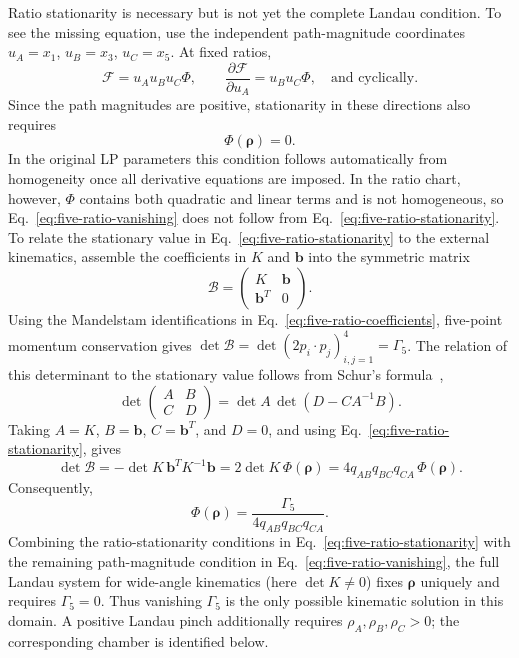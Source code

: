 \documentclass[a4paper,11pt]{article}
\begin{document}
Ratio stationarity is necessary but is not yet the complete Landau
condition.  To see the missing equation, use the independent path-magnitude
coordinates \(u_A=x_1\), \(u_B=x_3\), \(u_C=x_5\).  At fixed ratios,
\begin{equation}
 \mathcal F=u_Au_Bu_C\Phi,
 \qquad
 \frac{\partial\mathcal F}{\partial u_A}
 =u_Bu_C\Phi,
 \quad\text{and cyclically}.
 \label{eq:five-path-magnitude-equations}
\end{equation}
Since the path magnitudes are positive, stationarity in these directions
also requires
\begin{equation}
 \Phi(\boldsymbol\rho)=0.
 \label{eq:five-ratio-vanishing}
\end{equation}
In the original LP parameters this condition follows automatically
from homogeneity once all derivative equations are imposed.  In the ratio
chart, however, \(\Phi\) contains both quadratic and linear terms and is not
homogeneous, so Eq.~\eqref{eq:five-ratio-vanishing} does not follow from
Eq.~\eqref{eq:five-ratio-stationarity}.  To relate the stationary value in
Eq.~\eqref{eq:five-ratio-stationarity} to the external kinematics, assemble
the coefficients in \(K\) and \(\boldsymbol b\) into the symmetric matrix
\[
 \mathcal B=\begin{pmatrix}K&\boldsymbol b\\
                  \boldsymbol b^T&0\end{pmatrix}.
\]
Using the Mandelstam identifications in
Eq.~\eqref{eq:five-ratio-coefficients}, five-point momentum conservation
gives
\(\det\mathcal B=\det(2p_i\!\cdot p_j)_{i,j=1}^{4}=\Gamma_5\).
The relation of this determinant to the stationary value follows from
Schur's formula~\cite{Zhang:2005SchurComplement},
\[
 \det\begin{pmatrix}A&B\\ C&D\end{pmatrix}
 =\det A\,\det\!\left(D-CA^{-1}B\right).
\]
Taking \(A=K\), \(B=\boldsymbol b\),
\(C=\boldsymbol b^T\), and \(D=0\), and using
Eq.~\eqref{eq:five-ratio-stationarity}, gives
\[
 \det\mathcal B
 =-\det K\,\boldsymbol b^TK^{-1}\boldsymbol b
 =2\det K\,\Phi(\boldsymbol\rho)
 =4q_{AB}q_{BC}q_{CA}\,\Phi(\boldsymbol\rho).
\]
Consequently,
\begin{equation}
 \Phi(\boldsymbol\rho)=
 \frac{\Gamma_5}{4q_{AB}q_{BC}q_{CA}}.
 \label{eq:five-stationary-gram}
\end{equation}
Combining the ratio-stationarity conditions in
Eq.~\eqref{eq:five-ratio-stationarity} with the remaining path-magnitude
condition in Eq.~\eqref{eq:five-ratio-vanishing}, the full Landau system for
wide-angle kinematics (here \(\det K\ne0\)) fixes \(\boldsymbol\rho\)
uniquely and requires \(\Gamma_5=0\).  Thus vanishing \(\Gamma_5\) is the
only possible kinematic solution in this domain.  A positive Landau pinch
additionally requires \(\rho_A,\rho_B,\rho_C>0\); the corresponding chamber
is identified below.
\end{document}
